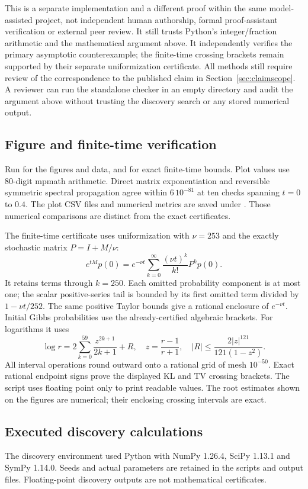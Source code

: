 \documentclass[11pt]{article}
\begin{document}
This is a separate implementation and a different proof within the same model-assisted project, not independent human authorship, formal proof-assistant verification or external peer review. It still trusts Python's integer/fraction arithmetic and the mathematical argument above. It independently verifies the primary asymptotic counterexample; the finite-time crossing brackets remain supported by their separate uniformization certificate. All methods still require review of the correspondence to the published claim in Section~\ref{sec:claimscope}. A reviewer can run the standalone checker in an empty directory and audit the argument above without trusting the discovery search or any stored numerical output.

\subsection{Figure and finite-time verification}
Run  for the figures and data, and  for exact finite-time bounds. Plot values use 80-digit mpmath arithmetic. Direct matrix exponentiation and reversible symmetric spectral propagation agree within $6\,10^{-81}$ at ten checks spanning $t=0$ to $0.4$. The plot CSV files and numerical metrics are saved under . Those numerical comparisons are distinct from the exact certificates.

The finite-time certificate uses uniformization with $\nu=253$ and the exactly stochastic matrix $P=I+M/\nu$:
\[
e^{tM}p(0)=e^{-\nu t}\sum_{k=0}^{\infty}\frac{(\nu t)^k}{k!}P^kp(0).
\]
It retains terms through $k=250$. Each omitted probability component is at most one; the scalar positive-series tail is bounded by its first omitted term divided by $1-\nu t/252$. The same positive Taylor bounds give a rational enclosure of $e^{-\nu t}$. Initial Gibbs probabilities use the already-certified algebraic brackets. For logarithms it uses
\[
\log r=2\sum_{k=0}^{59}\frac{z^{2k+1}}{2k+1}+R,
\quad z=\frac{r-1}{r+1},\quad
|R|\leq\frac{2|z|^{121}}{121(1-z^2)}.
\]
All interval operations round outward onto a rational grid of mesh $10^{-50}$. Exact rational endpoint signs prove the displayed KL and TV crossing brackets. The script uses floating point only to print readable values. The root estimates shown on the figures are numerical; their enclosing crossing intervals are exact.

\subsection{Executed discovery calculations}
The discovery environment used Python with NumPy 1.26.4, SciPy 1.13.1 and SymPy 1.14.0. Seeds and actual parameters are retained in the scripts and output files. Floating-point discovery outputs are not mathematical certificates.
\end{document}
